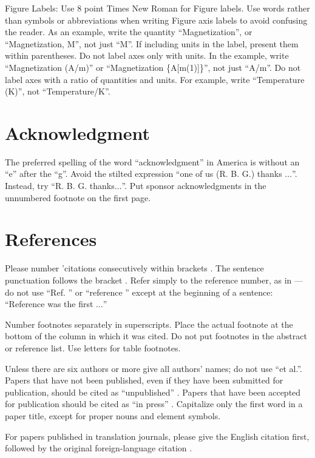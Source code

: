 \documentclass[conference]{IEEEtran}
\begin{document}
Figure Labels: Use 8 point Times New Roman for Figure labels. Use words 
rather than symbols or abbreviations when writing Figure axis labels to 
avoid confusing the reader. As an example, write the quantity 
``Magnetization'', or ``Magnetization, M'', not just ``M''. If including 
units in the label, present them within parentheses. Do not label axes only 
with units. In the example, write ``Magnetization (A/m)'' or ``Magnetization 
\{A[m(1)]\}'', not just ``A/m''. Do not label axes with a ratio of 
quantities and units. For example, write ``Temperature (K)'', not 
``Temperature/K''.

\section*{Acknowledgment}

The preferred spelling of the word ``acknowledgment'' in America is without 
an ``e'' after the ``g''. Avoid the stilted expression ``one of us (R. B. 
G.) thanks $\ldots$''. Instead, try ``R. B. G. thanks$\ldots$''. Put sponsor 
acknowledgments in the unnumbered footnote on the first page.

\section*{References}

Please number 'citations consecutively within brackets . The 
sentence punctuation follows the bracket . Refer simply to the reference 
number, as in ---do not use ``Ref. '' or ``reference '' except at 
the beginning of a sentence: ``Reference  was the first $\ldots$''

Number footnotes separately in superscripts. Place the actual footnote at 
the bottom of the column in which it was cited. Do not put footnotes in the 
abstract or reference list. Use letters for table footnotes.

Unless there are six authors or more give all authors' names; do not use 
``et al.''. Papers that have not been published, even if they have been 
submitted for publication, should be cited as ``unpublished'' . Papers 
that have been accepted for publication should be cited as ``in press'' . 
Capitalize only the first word in a paper title, except for proper nouns and 
element symbols.

For papers published in translation journals, please give the English 
citation first, followed by the original foreign-language citation .



\end{document}
